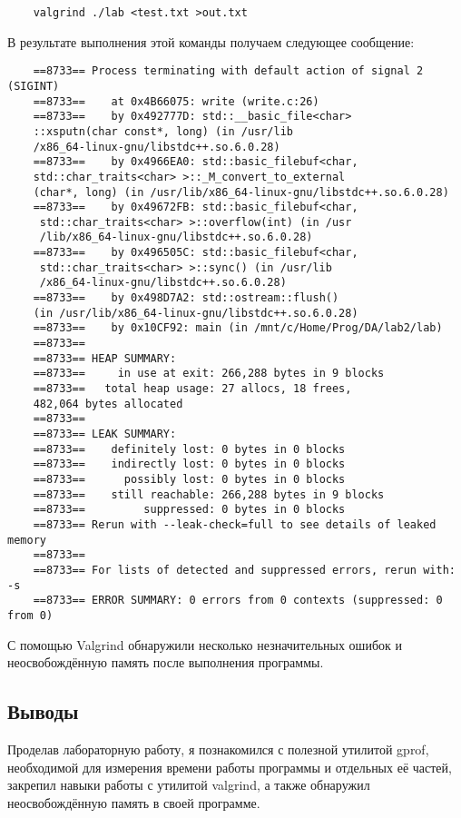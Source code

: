 \documentclass[12pt]{article}
\begin{document}
\begin{lstlisting}
    valgrind ./lab <test.txt >out.txt
\end{lstlisting}

В результате выполнения этой команды получаем следующее сообщение:

\begin{lstlisting}
    ==8733== Process terminating with default action of signal 2 (SIGINT)
    ==8733==    at 0x4B66075: write (write.c:26)
    ==8733==    by 0x492777D: std::__basic_file<char>
    ::xsputn(char const*, long) (in /usr/lib
    /x86_64-linux-gnu/libstdc++.so.6.0.28)
    ==8733==    by 0x4966EA0: std::basic_filebuf<char, 
    std::char_traits<char> >::_M_convert_to_external
    (char*, long) (in /usr/lib/x86_64-linux-gnu/libstdc++.so.6.0.28)
    ==8733==    by 0x49672FB: std::basic_filebuf<char,
     std::char_traits<char> >::overflow(int) (in /usr
     /lib/x86_64-linux-gnu/libstdc++.so.6.0.28)
    ==8733==    by 0x496505C: std::basic_filebuf<char,
     std::char_traits<char> >::sync() (in /usr/lib
     /x86_64-linux-gnu/libstdc++.so.6.0.28)
    ==8733==    by 0x498D7A2: std::ostream::flush() 
    (in /usr/lib/x86_64-linux-gnu/libstdc++.so.6.0.28)
    ==8733==    by 0x10CF92: main (in /mnt/c/Home/Prog/DA/lab2/lab)
    ==8733== 
    ==8733== HEAP SUMMARY:
    ==8733==     in use at exit: 266,288 bytes in 9 blocks
    ==8733==   total heap usage: 27 allocs, 18 frees, 
    482,064 bytes allocated
    ==8733== 
    ==8733== LEAK SUMMARY:
    ==8733==    definitely lost: 0 bytes in 0 blocks
    ==8733==    indirectly lost: 0 bytes in 0 blocks
    ==8733==      possibly lost: 0 bytes in 0 blocks
    ==8733==    still reachable: 266,288 bytes in 9 blocks
    ==8733==         suppressed: 0 bytes in 0 blocks
    ==8733== Rerun with --leak-check=full to see details of leaked memory
    ==8733== 
    ==8733== For lists of detected and suppressed errors, rerun with: -s
    ==8733== ERROR SUMMARY: 0 errors from 0 contexts (suppressed: 0 from 0)
\end{lstlisting}

С помощью Valgrind обнаружили несколько незначительных ошибок и неосвобождённую память 
после выполнения программы.

\subsection*{Выводы}

Проделав лабораторную работу, я познакомился с полезной утилитой gprof, 
необходимой для измерения времени работы программы и отдельных её частей, 
закрепил навыки работы с утилитой valgrind, а также обнаружил неосвобождённую память в 
своей программе.
\end{document}
